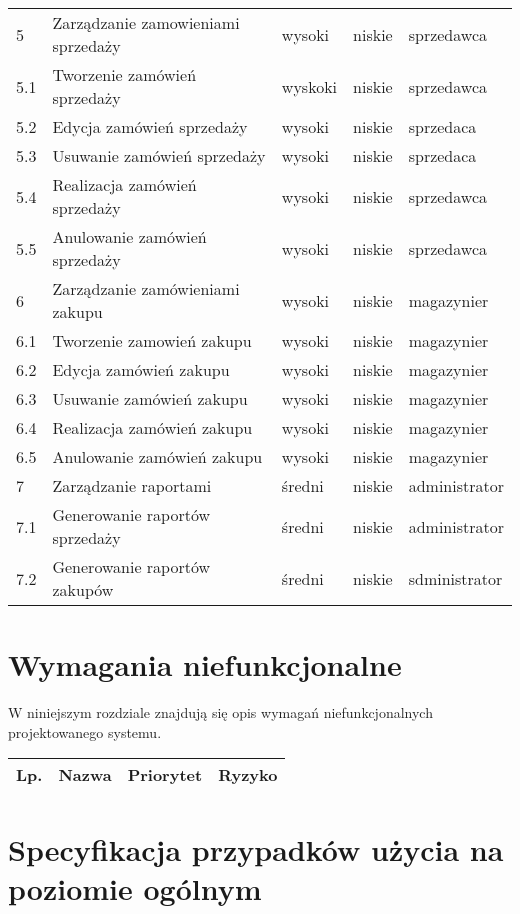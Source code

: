 \begin{table}[ht]
\begin{center}
\begin{tabular}{| l | l | l | l | l |}
		   	\hline
		   	5 & Zarządzanie zamowieniami sprzedaży & wysoki & niskie & sprzedawca \\
		   	5.1 & Tworzenie zamówień sprzedaży & wyskoki & niskie & sprzedawca \\
		   	5.2 & Edycja zamówień sprzedaży & wysoki & niskie & sprzedaca \\
		   	5.3 & Usuwanie zamówień sprzedaży & wysoki & niskie & sprzedaca \\
		   	5.4 & Realizacja zamówień sprzedaży & wysoki & niskie & sprzedawca \\
		   	5.5 & Anulowanie zamówień sprzedaży & wysoki & niskie & sprzedawca \\
		   	\hline
		   	6 & Zarządzanie zamówieniami zakupu & wysoki & niskie & magazynier \\
		   	6.1 & Tworzenie zamowień zakupu & wysoki & niskie & magazynier \\
		   	6.2 & Edycja zamówień zakupu & wysoki & niskie & magazynier \\
		   	6.3 & Usuwanie zamówień zakupu & wysoki & niskie & magazynier \\
		   	6.4 & Realizacja zamówień zakupu & wysoki & niskie & magazynier \\
		   	6.5 & Anulowanie zamówień zakupu & wysoki & niskie & magazynier \\
		   	\hline
		   	7 & Zarządzanie raportami & średni & niskie & administrator \\
		   	7.1 & Generowanie raportów sprzedaży & średni & niskie & administrator \\
		   	7.2 & Generowanie raportów zakupów & średni & niskie & sdministrator \\
		   	\hline
		   	\hline
	    \end{tabular}
	\end{center}
\end{table}
\FloatBarrier

\section{Wymagania niefunkcjonalne}

W niniejszym rozdziale znajdują się opis wymagań niefunkcjonalnych
projektowanego systemu.

\begin{table}[h]
	\begin{center}
		\begin{tabular}{| l | l | l | l |}
			\hline
			\textbf{Lp.} & \textbf{Nazwa} & \textbf{Priorytet} & \textbf{Ryzyko} \\
			\hline
		\end{tabular}
	\end{center}
\end{table}
\FloatBarrier

\section{Specyfikacja przypadków użycia na poziomie ogólnym}